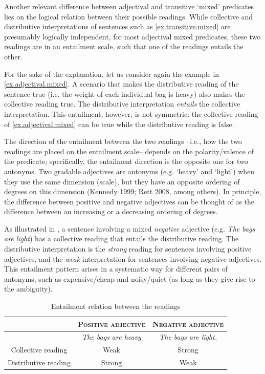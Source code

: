 \documentclass[a4paper, 11pt]{article}
\begin{document}
\vspace{0.5cm}
Another relevant difference between adjectival and transitive `mixed' predicates lies on the logical relation between their possible readings. 
While collective and distributive interpretations of sentences such as \ref{ex.transitive.mixed} are presumably logically independent, for most adjectival mixed predicates, these two readings are in an entailment scale, such that one of the readings entails the other. 

For the sake of the explanation, let us consider again the example in  \ref{ex.adjectival.mixed}. A scenario that makes the distributive reading of the sentence true (i.e. the weight of each individual bag is heavy) also makes the collective reading true. The distributive interpretation \emph{entails} the collective interpretation. This entailment, however, is not symmetric: the collective reading of \ref{ex.adjectival.mixed} can be true while the distributive reading is false. 

The direction of the entailment between the two readings --i.e., how the two readings are placed on the entailment scale-- depends on the polarity/valence of the predicate; specifically, the entailment direction is the opposite one for two antonyms. Two gradable adjectives are antonyms (e.g. `heavy' and `light') when they use the same dimension (scale), but they have an opposite ordering of degrees on this dimension (Kennedy 1999; Rett 2008, among others). In principle, the difference between positive and negative adjectives can be thought of as the difference between an increasing or a decreasing ordering of degrees.

As illustrated in , a sentence involving a mixed \emph{negative} adjective (e.g. \textit{The bags are light}) has a collective reading that entails the distributive reading. The distributive interpretation is the \emph{strong} reading for sentences involving positive adjectives, and the \emph{weak} interpretation for sentences involving negative adjectives. This entailment pattern arises in a systematic way for different pairs of antonyms, such as expensive/cheap and noisy/quiet (as long as they give rise to the ambiguity). 

\begin{table}[h!]
\centering
\begin{tabular}{c|c|c}
& \textsc{Positive adjective} & \textsc{Negative adjective} \\
\hline
& \textit{The bags are heavy} & \textit{The bags are light.}\\
Collective reading & Weak & Strong \\
Distributive reading & Strong & Weak\\
\end{tabular}
\caption[]{Entailment relation between the readings}
\label{table.readings.polarity}
\end{table}
\end{document}
